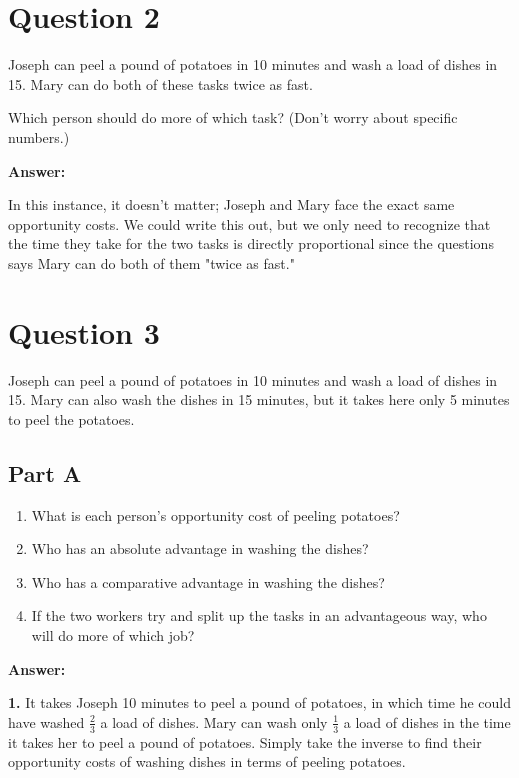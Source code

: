 \documentclass[12pt]{article}
\begin{document}
\section*{Question 2}
Joseph can peel a pound of potatoes in 10 minutes and wash a load of dishes in 15. Mary can do both of these tasks twice as fast. 

\medskip

Which person should do more of which task? (Don't worry about specific numbers.)

\medskip

\textbf{Answer:}

In this instance, it doesn't matter; Joseph and Mary face the exact same opportunity costs. We could write this out, but we only need to recognize that the time they take for the two tasks is directly proportional since the questions says Mary can do both of them "twice as fast."

\section*{Question 3}
Joseph can peel a pound of potatoes in 10 minutes and wash a load of dishes in 15. Mary can also wash the dishes in 15 minutes, but it takes here only 5 minutes to peel the potatoes. 
    
\subsection*{Part A}
    \begin{enumerate}
        \item What is each person's opportunity cost of peeling potatoes?
        \item Who has an absolute advantage in washing the dishes?
        \item Who has a comparative advantage in washing the dishes?
        \item If the two workers try and split up the tasks in an advantageous way, who will do more of which job?
    \end{enumerate}

\textbf{Answer:}

\medskip

\textbf{1.} It takes Joseph 10 minutes to peel a pound of potatoes, in which time he could have washed $\frac{2}{3}$ a load of dishes. Mary can wash only $\frac{1}{3}$ a load of dishes in the time it takes her to peel a pound of potatoes. Simply take the inverse to find their opportunity costs of washing dishes in terms of peeling potatoes.
\end{document}

